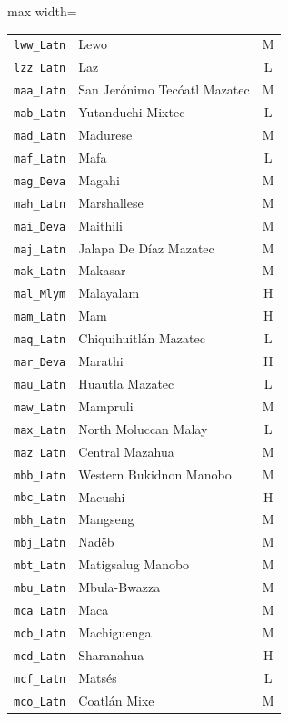 {\begin{adjustbox}{max width=\textwidth}
\begin{tabular}{llc}
        \texttt{lww\_Latn} & Lewo & M \\
        \texttt{lzz\_Latn} & Laz & L \\
        \texttt{maa\_Latn} & San Jerónimo Tecóatl Mazatec & M \\
        \texttt{mab\_Latn} & Yutanduchi Mixtec & L \\
        \texttt{mad\_Latn} & Madurese & M \\
        \texttt{maf\_Latn} & Mafa & L \\
        \texttt{mag\_Deva} & Magahi & M \\
        \texttt{mah\_Latn} & Marshallese & M \\
        \texttt{mai\_Deva} & Maithili & M \\
        \texttt{maj\_Latn} & Jalapa De Díaz Mazatec & M \\
        \texttt{mak\_Latn} & Makasar & M \\
        \texttt{mal\_Mlym} & Malayalam & H \\
        \texttt{mam\_Latn} & Mam & H \\
        \texttt{maq\_Latn} & Chiquihuitlán Mazatec & L \\
        \texttt{mar\_Deva} & Marathi & H \\
        \texttt{mau\_Latn} & Huautla Mazatec & L \\
        \texttt{maw\_Latn} & Mampruli & M \\
        \texttt{max\_Latn} & North Moluccan Malay & L \\
        \texttt{maz\_Latn} & Central Mazahua & M \\
        \texttt{mbb\_Latn} & Western Bukidnon Manobo & M \\
        \texttt{mbc\_Latn} & Macushi & H \\
        \texttt{mbh\_Latn} & Mangseng & M \\
        \texttt{mbj\_Latn} & Nadëb & M \\
        \texttt{mbt\_Latn} & Matigsalug Manobo & M \\
        \texttt{mbu\_Latn} & Mbula-Bwazza & M \\
        \texttt{mca\_Latn} & Maca & M \\
        \texttt{mcb\_Latn} & Machiguenga & M \\
        \texttt{mcd\_Latn} & Sharanahua & H \\
        \texttt{mcf\_Latn} & Matsés & L \\
        \texttt{mco\_Latn} & Coatlán Mixe & M \\

\end{tabular}
\end{adjustbox}}
